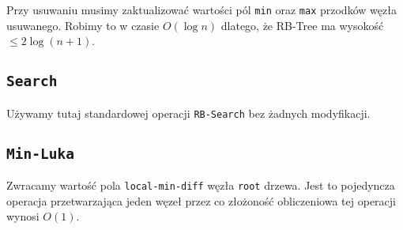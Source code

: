 \documentclass[14pt]{article}
\begin{document}
Przy usuwaniu musimy zaktualizować wartości pól \texttt{min} oraz \texttt{max} przodków węzła usuwanego. Robimy to w czasie $O(\log n)$ dlatego, że RB-Tree ma wysokość $\le 2\log(n+1)$.

\subsection{\texttt{Search}}

Używamy tutaj standardowej operacji \texttt{RB-Search} bez żadnych modyfikacji.

\subsection{\texttt{Min-Luka}}

Zwracamy wartość pola \texttt{local-min-diff} węzła \texttt{root} drzewa. Jest to pojedyncza operacja przetwarzająca jeden węzeł przez co złożoność obliczeniowa tej operacji wynosi $O(1)$.
\end{document}
